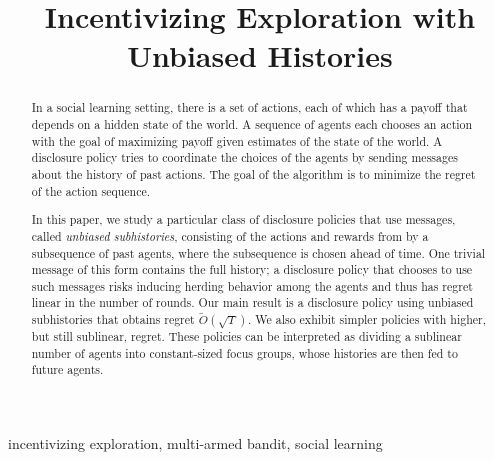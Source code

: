 \documentclass[anon,12pt]{colt2019}
\title{Incentivizing Exploration with Unbiased Histories}
\begin{document}
\maketitle

\begin{abstract}
In a social learning setting, there is a set of actions, each of which has a payoff that depends on a hidden state of the world. A sequence of agents each chooses an action with the goal of maximizing payoff given estimates of the state of the world.  A disclosure policy tries to coordinate the choices of the agents by sending messages about the history of past actions.  The goal of the algorithm is to minimize the regret of the action sequence.

In this paper, we study a particular class of disclosure policies that use messages, called {\em unbiased subhistories}, consisting of the actions and rewards from by a subsequence of past agents, where the subsequence is chosen ahead of time. One trivial message of this form contains the full history; a disclosure policy that chooses to use such messages risks inducing herding behavior among the agents and thus has regret linear in the number of rounds.  Our main result is a disclosure policy using unbiased subhistories that obtains regret $\tilde{O}(\sqrt{T})$.  We also exhibit simpler policies with higher, but still sublinear, regret.  These policies can be interpreted as dividing a sublinear number of agents into constant-sized focus groups, whose histories are then fed to future agents.
\end{abstract}
\begin{keywords}%
  incentivizing exploration, multi-armed bandit, social learning
\end{keywords}



%







\newpage

%
%


\appendix

\newpage





%
\end{document}
